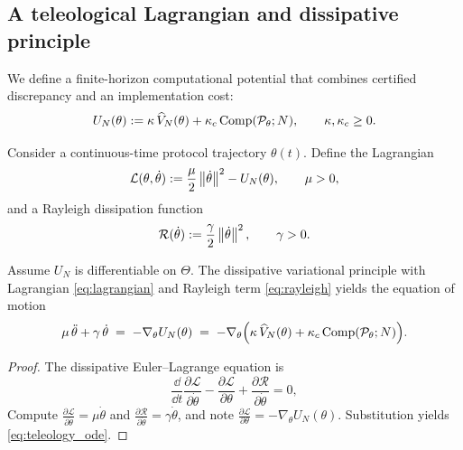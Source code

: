 \subsection{A teleological Lagrangian and dissipative principle}
\label{sec:teleological_lagrangian}

We define a finite-horizon computational potential that combines certified discrepancy and an implementation cost:
\begin{equation}
\label{eq:U_def}
U_N(\theta):=\kappa\,\widehat V_N(\theta)+\kappa_c\,\mathrm{Comp}(\mathcal{P}_\theta;N),
\qquad \kappa,\kappa_c\ge 0.
\end{equation}

Consider a continuous-time protocol trajectory $\theta(t)$.
Define the Lagrangian
\begin{equation}
\label{eq:lagrangian}
\mathcal{L}(\theta,\dot\theta)
:=\frac{\mu}{2}\left\lVert \dot\theta\right\rVert^2-U_N(\theta),
\qquad \mu>0,
\end{equation}
and a Rayleigh dissipation function
\begin{equation}
\label{eq:rayleigh}
\mathcal{R}(\dot\theta):=\frac{\gamma}{2}\left\lVert \dot\theta\right\rVert^2,
\qquad \gamma>0.
\end{equation}

\begin{theorem}
\label{thm:teleology_dynamics}
Assume $U_N$ is differentiable on $\Theta$.
The dissipative variational principle with Lagrangian \eqref{eq:lagrangian} and Rayleigh term \eqref{eq:rayleigh} yields the equation of motion
\begin{equation}
\label{eq:teleology_ode}
\mu\,\ddot\theta+\gamma\,\dot\theta
\;=\;
-\nabla_\theta U_N(\theta)
\;=\;
-\nabla_\theta\Big(\kappa\,\widehat V_N(\theta)+\kappa_c\,\mathrm{Comp}(\mathcal{P}_\theta;N)\Big).
\end{equation}
\end{theorem}

\begin{proof}
The dissipative Euler--Lagrange equation is
\[
\frac{\dd}{\dd t}\frac{\partial \mathcal{L}}{\partial \dot\theta}
-\frac{\partial \mathcal{L}}{\partial \theta}
+\frac{\partial \mathcal{R}}{\partial \dot\theta}=0,
\]
Compute $\frac{\partial \mathcal{L}}{\partial \dot\theta}=\mu\dot\theta$ and $\frac{\partial \mathcal{R}}{\partial \dot\theta}=\gamma\dot\theta$, and note $\frac{\partial \mathcal{L}}{\partial \theta}=-\nabla_\theta U_N(\theta)$.
Substitution yields \eqref{eq:teleology_ode}.
\end{proof}

